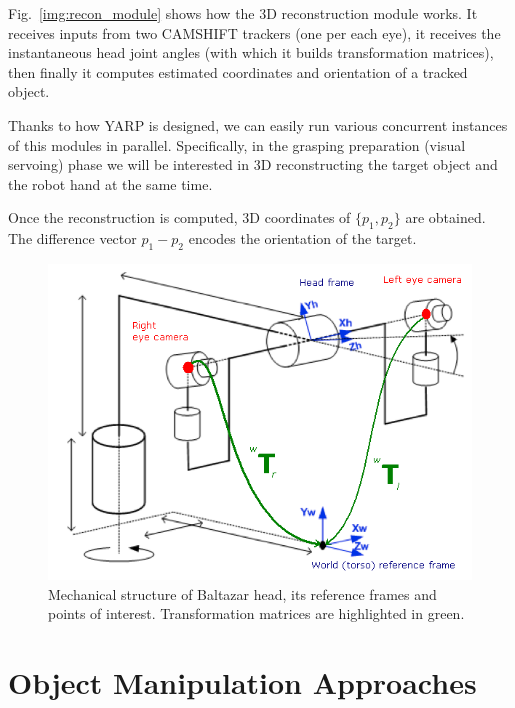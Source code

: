 Fig.~\ref{img:recon_module} shows how the 3D reconstruction module works. It receives inputs from two \ac{CAMSHIFT} trackers (one per each eye), it receives the instantaneous head joint angles (with which it builds transformation matrices), then finally it computes estimated coordinates and orientation of a tracked object.

Thanks to how \ac{YARP} is designed, we can easily run various concurrent instances of this modules in parallel. Specifically, in the grasping preparation (visual servoing) phase we will be interested in 3D reconstructing the target object and the robot hand at the same time.

Once the reconstruction is computed, 3D coordinates of $\{ p_1, p_2\}$ are obtained.
The difference vector $p_1 - p_2$ encodes the orientation of the target.


\begin{figure}
\centering
\includegraphics[scale=0.5]{figures/balta_head_transf}
\caption[Structure of Baltazar head with transformation matrices]{Mechanical structure of Baltazar head, its reference frames and points of interest. Transformation matrices are highlighted in green.}
\label{img:balta_head_transf}
\end{figure}












\section{Object Manipulation Approaches}


